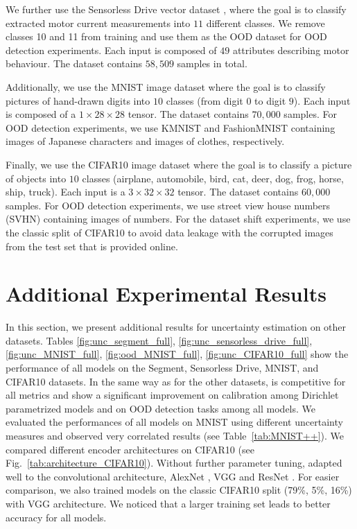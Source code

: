 We further use the Sensorless Drive vector dataset \cite{uci_datasets}, where the goal is to classify extracted motor current measurements into $11$ different classes. We remove classes 10 and 11 from training and use them as the OOD dataset for OOD detection experiments. Each input is composed of $49$ attributes describing motor behaviour. The dataset contains $58,509$ samples in total.

Additionally, we use the MNIST image dataset \cite{mnist} where the goal is to classify pictures of hand-drawn digits into $10$ classes (from digit $0$ to digit $9$). Each input is composed of a $1 \times 28 \times 28$ tensor. The dataset contains $70,000$ samples. For OOD detection experiments, we use KMNIST \cite{kmnist} and FashionMNIST \cite{fashionmnist} containing images of Japanese characters and images of clothes, respectively. 

Finally, we use the CIFAR10 image dataset \cite{cifar10} where the goal is to classify a picture of objects into $10$ classes (airplane, automobile, bird, cat, deer, dog, frog, horse, ship, truck). Each input is a $3 \times 32 \times 32$ tensor. The dataset contains $60,000$ samples. For OOD detection experiments, we use street view house numbers (SVHN) \cite{svhn} containing images of numbers. For the dataset shift experiments, we use the classic split of CIFAR10 to avoid data leakage with the corrupted images from the test set that is provided online.

\section{Additional Experimental Results}
\label{sec:app_additional_results}

In this section, we present additional results for uncertainty estimation on other datasets. Tables \ref{fig:unc_segment_full}, \ref{fig:unc_sensorless_drive_full}, \ref{fig:unc_MNIST_full}, \ref{fig:ood_MNIST_full}, \ref{fig:unc_CIFAR10_full} show the performance of all models on the Segment, Sensorless Drive, MNIST, and CIFAR10 datasets. In the same way as for the other datasets, \PostNetacro is competitive for all metrics and show a significant improvement on calibration among Dirichlet parametrized models and on OOD detection tasks among all models. We evaluated the performances of all models on MNIST using different uncertainty measures and observed very correlated results (see Table~\ref{tab:MNIST++}). We compared different encoder architectures on CIFAR10 (see Fig.~\ref{tab:architecture_CIFAR10}). Without further parameter tuning, \PostNetacro adapted well to the convolutional architecture, AlexNet \cite{alexnet}, VGG \cite{vgg} and ResNet \cite{resnet}. For easier comparison, we also trained models on the classic CIFAR10 split (79\%, 5\%, 16\%) with VGG architecture. We noticed that a larger training set leads to better accuracy for all models.

